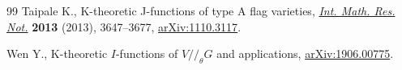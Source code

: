 \documentclass[11pt]{article}
\numberwithin{equation}{section}
\numberwithin{equation}{section}
\begin{document}
\begin{thebibliography}{99}
Taipale K., K-theoretic {J}-functions of type {A} flag varieties, \href{https://doi.org/10.1093/imrn/rns156}{\textit{Int.
 Math. Res. Not.}} \textbf{2013} (2013), 3647--3677, \href{https://arxiv.org/abs/1110.3117}{arXiv:1110.3117}.

Wen Y., {K}-theoretic {$I$}-functions of {$V//_{\theta}G$} and applications,
 \href{https://arxiv.org/abs/1906.00775}{arXiv:1906.00775}.

\end{thebibliography}
\end{document}
